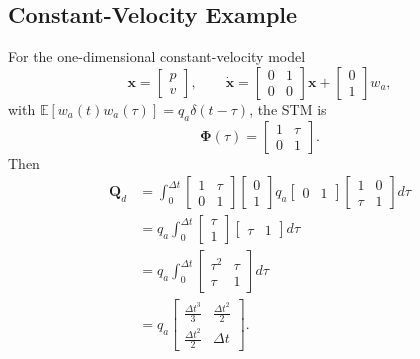 \documentclass[11pt,oneside]{book}
\newcommand{\E}{\mathbb{E}}
\newcommand{\Ph}{\boldsymbol{\Phi}}
\newcommand{\Qd}{\mathbf{Q}_d}
\begin{document}
\subsection{Constant-Velocity Example}
For the one-dimensional constant-velocity model
\begin{equation}
\mathbf{x}=\begin{bmatrix}p\\v\end{bmatrix},
\qquad
\dot{\mathbf{x}}=\begin{bmatrix}0&1\\0&0\end{bmatrix}\mathbf{x}+\begin{bmatrix}0\\1\end{bmatrix}w_a,
\end{equation}
with $\E[w_a(t)w_a(\tau)]=q_a\delta(t-\tau)$, the STM is
\begin{equation}
\Ph(\tau)=\begin{bmatrix}1&\tau\\0&1\end{bmatrix}.
\end{equation}
Then
\begin{align}
\Qd
&=\int_0^{\Delta t}
\begin{bmatrix}1&\tau\\0&1\end{bmatrix}
\begin{bmatrix}0\\1\end{bmatrix}q_a
\begin{bmatrix}0&1\end{bmatrix}
\begin{bmatrix}1&0\\\tau&1\end{bmatrix}d\tau\\
&=q_a\int_0^{\Delta t}
\begin{bmatrix}\tau\\1\end{bmatrix}
\begin{bmatrix}\tau&1\end{bmatrix}d\tau\\
&=q_a\int_0^{\Delta t}
\begin{bmatrix}\tau^2&\tau\\\tau&1\end{bmatrix}d\tau\\
&=q_a\begin{bmatrix}\frac{\Delta t^3}{3}&\frac{\Delta t^2}{2}\\\frac{\Delta t^2}{2}&\Delta t\end{bmatrix}.
\end{align}
\end{document}
